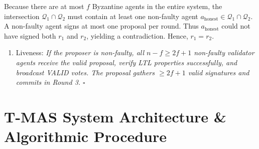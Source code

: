 \documentclass[10pt,journal,compsoc,twocolumn]{IEEEtran}
\begin{document}
Because there are at most $f$ Byzantine agents in the entire system, the intersection $\mathcal{Q}_1 \cap \mathcal{Q}_2$ must contain at least one non-faulty agent $a_{\text{honest}} \in \mathcal{Q}_1 \cap \mathcal{Q}_2$. A non-faulty agent signs at most one proposal per round. Thus $a_{\text{honest}}$ could not have signed both $r_1$ and $r_2$, yielding a contradiction. Hence, $r_1 = r_2$.

\begin{enumerate}
  \item Liveness:\textit{ If the proposer is non-faulty, all $n - f \ge 2f + 1$ non-faulty validator agents receive the valid proposal, verify LTL properties successfully, and broadcast VALID votes. The proposal gathers $\ge 2f + 1$ valid signatures and commits in Round 3. $\square$}
\end{enumerate}




\section{T-MAS System Architecture \& Algorithmic Procedure}
\end{document}

